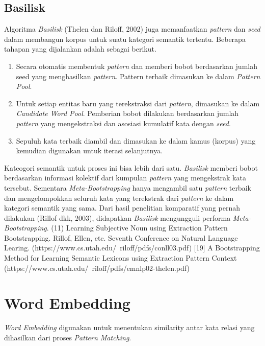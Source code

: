\subsection{Basilisk}
Algoritma \textit{Basilisk} (Thelen dan Riloff, 2002) juga memanfaatkan \textit{pattern} dan \textit{seed} dalam membangun korpus untuk suatu kategori semantik tertentu. Beberapa tahapan yang dijalankan adalah sebagai berikut.
\begin{enumerate}
  \item Secara otomatis membentuk \textit{pattern} dan memberi bobot berdasarkan jumlah seed yang menghasilkan \textit{pattern}. Pattern terbaik dimasukan ke dalam \textit{Pattern Pool}.
  \item Untuk setiap entitas baru yang terekstraksi dari \textit{pattern}, dimasukan ke dalam \textit{Candidate Word Pool}. Pemberian bobot dilakukan berdasarkan jumlah \textit{pattern} yang mengekstraksi dan asosiasi kumulatif kata dengan \textit{seed}.
  \item Sepuluh kata terbaik diambil dan dimasukan ke dalam kamus (korpus) yang kemudian digunakan untuk iterasi selanjutnya. 
\end{enumerate}

Kateogori semantik untuk proses ini bisa lebih dari satu. \textit{Basilisk} memberi bobot berdasarkan informasi kolektif dari kumpulan \textit{pattern} yang mengekstrak kata tersebut. Sementara \textit{Meta-Bootstrapping} hanya mengambil satu \textit{pattern} terbaik dan mengelompokkan seluruh kata yang terekstrak dari \textit{pattern} ke dalam kategori semantik yang sama. Dari hasil penelitian komparatif yang pernah dilakukan (Rillof dkk, 2003), didapatkan \textit{Basilisk} mengungguli performa \textit{Meta-Bootstrapping}. 
(11) Learning Subjective Noun using Extraction Pattern Bootstrapping. Rillof, Ellen, etc. Seventh Conference on Natural Language Learing.  (https://www.cs.utah.edu/~riloff/pdfs/conll03.pdf)
[19] A Bootstrapping Method for Learning Semantic Lexicons using Extraction Pattern Context (https://www.cs.utah.edu/~riloff/pdfs/emnlp02-thelen.pdf)

\section{Word Embedding}
\textit{Word Embedding} digunakan untuk menentukan similarity antar kata relasi yang dihasilkan dari proses \textit{Pattern Matching}.

